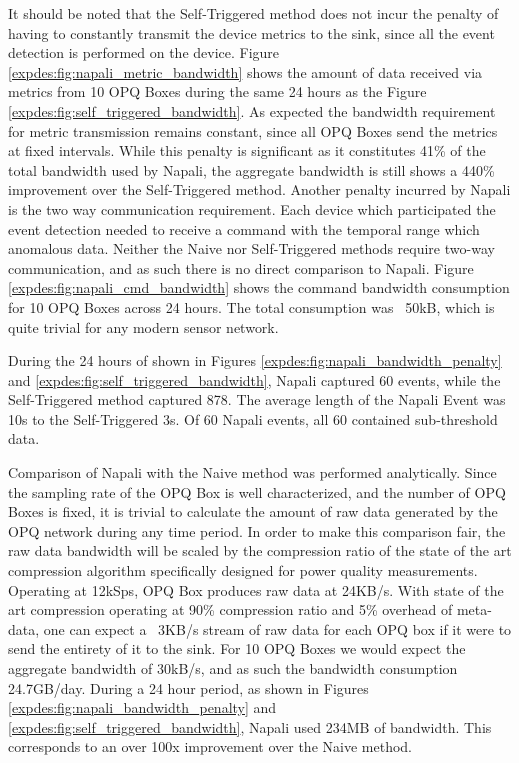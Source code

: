 It should be noted that the Self-Triggered method does not incur the penalty of having to constantly transmit the device metrics to the sink, since all the event detection is performed on the device.
Figure \ref{expdes:fig:napali_metric_bandwidth} shows the amount of data received via metrics from 10 OPQ Boxes during the same 24 hours as the Figure \ref{expdes:fig:self_triggered_bandwidth}.
As expected the bandwidth requirement for metric transmission remains constant, since all OPQ Boxes send the metrics at fixed intervals.
While this penalty is significant as it constitutes 41\% of the total bandwidth used by Napali, the aggregate bandwidth is still shows a 440\% improvement over the Self-Triggered method.
Another penalty incurred by Napali is the two way communication requirement.
Each device which participated the event detection needed to receive a command with the temporal range which anomalous data.
Neither the Naive nor Self-Triggered methods require two-way communication, and as such there is no direct comparison to Napali.
Figure \ref{expdes:fig:napali_cmd_bandwidth} shows the command bandwidth consumption for 10 OPQ Boxes across 24 hours.
The total consumption was ~50kB, which is quite trivial for any modern sensor network.

During the 24 hours of shown in Figures \ref{expdes:fig:napali_bandwidth_penalty} and \ref{expdes:fig:self_triggered_bandwidth}, Napali captured 60 events, while the Self-Triggered method captured 878.
The average length of the Napali Event was 10s to the Self-Triggered 3s.
Of 60 Napali events, all 60 contained sub-threshold data.

Comparison of Napali with the Naive method was performed analytically.
Since the sampling rate of the OPQ Box is well characterized, and the number of OPQ Boxes is fixed, it is trivial to calculate the amount of raw data generated by the OPQ network during any time period.
In order to make this comparison fair, the raw data bandwidth will be scaled by the compression ratio of the state of the art compression algorithm specifically designed for power quality measurements.\cite{zhang2009new}
Operating at 12kSps, OPQ Box produces raw data at 24KB/s.
With state of the art compression operating at 90\% compression ratio and 5\% overhead of meta-data, one can expect a ~3KB/s stream of raw data for each OPQ box if it were to send the entirety of it to the sink.
For 10 OPQ Boxes we would expect the aggregate bandwidth of 30kB/s, and as such the bandwidth consumption 24.7GB/day.
During a 24 hour period, as shown in Figures \ref{expdes:fig:napali_bandwidth_penalty} and \ref{expdes:fig:self_triggered_bandwidth}, Napali used 234MB of bandwidth.
This corresponds to an over 100x improvement over the Naive method.

